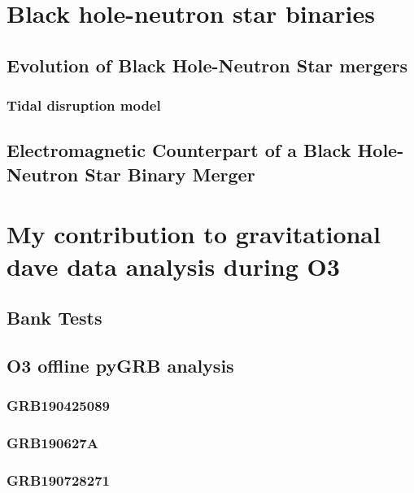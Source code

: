 \documentclass[binding=0.6cm, LaM]{sapthesis}
\begin{document}
\chapter{Black hole-neutron star binaries}



\section{Evolution of Black Hole-Neutron Star mergers}



\subsection{Tidal disruption model}




\section{Electromagnetic Counterpart of a Black Hole-Neutron Star Binary Merger}


\chapter{My contribution to gravitational dave data analysis during O3}

\section{Bank Tests}

\section{O3 offline pyGRB analysis}

\subsection{GRB190425089}

\subsection{GRB190627A}

\subsection{GRB190728271}
\end{document}
